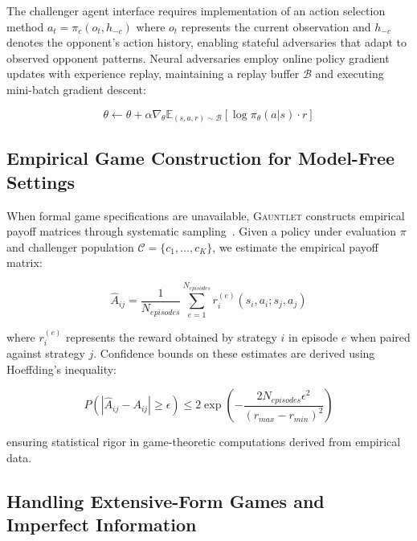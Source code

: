\documentclass[sigconf,anonymous]{aamas}
\begin{document}
The challenger agent interface requires implementation of an action selection method $a_t = \pi_c(o_t, h_{-c})$ where $o_t$ represents the current observation and $h_{-c}$ denotes the opponent's action history, enabling stateful adversaries that adapt to observed opponent patterns. Neural adversaries employ online policy gradient updates with experience replay, maintaining a replay buffer $\mathcal{B}$ and executing mini-batch gradient descent:

\begin{equation}
\theta \leftarrow \theta + \alpha \nabla_\theta \mathbb{E}_{(s,a,r) \sim \mathcal{B}}\left[\log \pi_\theta(a|s) \cdot r\right]
\label{eq:neural_adversary_update}
\end{equation}

\subsection{Empirical Game Construction for Model-Free Settings}

When formal game specifications are unavailable, \textsc{Gauntlet} constructs empirical payoff matrices through systematic sampling~\cite{Wellman2006}. Given a policy under evaluation $\pi$ and challenger population $\mathcal{C} = \{c_1, \ldots, c_K\}$, we estimate the empirical payoff matrix:

\begin{equation}
\hat{A}_{ij} = \frac{1}{N_{episodes}} \sum_{e=1}^{N_{episodes}} r_i^{(e)}(s_i, a_i; s_j, a_j)
\label{eq:empirical_payoff}
\end{equation}

where $r_i^{(e)}$ represents the reward obtained by strategy $i$ in episode $e$ when paired against strategy $j$. Confidence bounds on these estimates are derived using Hoeffding's inequality:

\begin{equation}
P\left(|\hat{A}_{ij} - A_{ij}| \geq \epsilon\right) \leq 2\exp\left(-\frac{2N_{episodes}\epsilon^2}{(r_{max} - r_{min})^2}\right)
\label{eq:hoeffding_bound}
\end{equation}

ensuring statistical rigor in game-theoretic computations derived from empirical data.

\subsection{Handling Extensive-Form Games and Imperfect Information}
\end{document}
